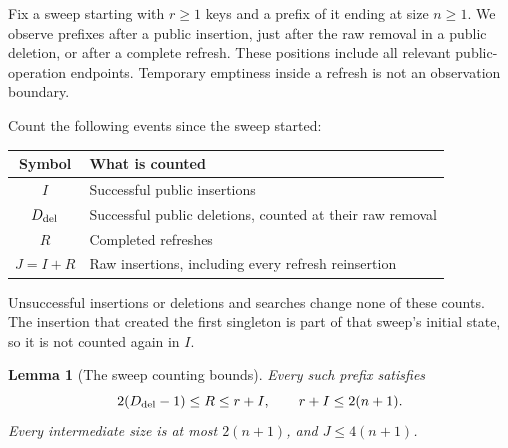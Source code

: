 \documentclass[11pt,a4paper]{article}
\theoremstyle{readable}
\newtheorem{lemma}[theorem]{Lemma}
\begin{document}
Fix a sweep starting with $r\ge1$ keys and a prefix of it ending at
size $n\ge1$. We observe prefixes after a public insertion, just after
the raw removal in a public deletion, or after a complete refresh.
These positions include all relevant public-operation endpoints.
Temporary emptiness inside a refresh is not an observation boundary.

Count the following events since the sweep started:
\begin{center}
\begin{tabular}{cl}
\toprule
Symbol & What is counted \\
\midrule
$I$ & Successful public insertions \\
$D_{\rm del}$ & Successful public deletions, counted at their raw removal \\
$R$ & Completed refreshes \\
$J=I+R$ & Raw insertions, including every refresh reinsertion \\
\bottomrule
\end{tabular}
\end{center}
Unsuccessful insertions or deletions and searches change none of these
counts. The insertion that created the first singleton is part of that
sweep's initial state, so it is not counted again in $I$.

\begin{lemma}[The sweep counting bounds]
\label{lem:counts}
Every such prefix satisfies
\begin{equation}
  2(D_{\rm del}-1)\le R\le r+I,
  \qquad r+I\le2(n+1).
  \label{eq:counts}
\end{equation}
Every intermediate size is at most $2(n+1)$, and
$J\le4(n+1)$.
\end{lemma}
\end{document}
